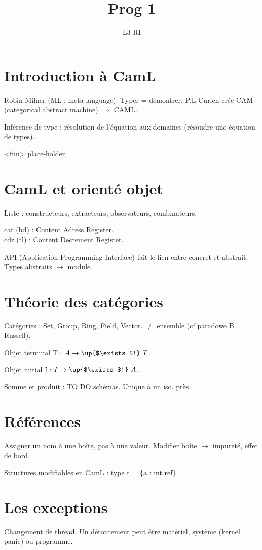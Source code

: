 \documentclass[french]{article}
\title{Prog 1}
\date{}
\author{L3 RI}
\begin{document}
\maketitle
\tableofcontents
\newpage

\section{Introduction à CamL}
Robin Milner (ML : meta-language).
Typer = démontrer.
P.L Curien crée CAM (categorical abstract machine)
$\Rightarrow$ CAML.

Inférence de type : résolution de l'équation aux domaines (résoudre une équation de types).

<fun> place-holder.

\section{CamL et orienté objet}
Liste : constructeurs, extracteurs, observateurs, combinateurs.

car (hd) : Content Adress Register.\\
cdr (tl) : Content Decrement Register.

API (Application Programming Interface) fait le lien entre concret et abstrait. Types abstraits $\mapsto$ module.

\section{Théorie des catégories}
Catégories : Set, Group, Ring, Field, Vector. $\neq$ ensemble (cf paradowe B. Russell).

Objet terminal T : $A \rightarrow\up{$\exists$!}\ T$.

Objet initial I : $I \rightarrow\up{$\exists$!}\ A$.

Somme et produit : TO DO schémas. Unique à un iso. près.

\section{Références}
Assigner un nom à une boîte, pas à une valeur. Modifier boîte $\rightarrow$ impureté, effet de bord.

Structures modifiables en CamL : type t = $\{$a : int ref$\}$.

\section{Les exceptions}
Changement de thread. Un déroutement peut être matériel, système (kernel panic) ou programme.
\end{document}
